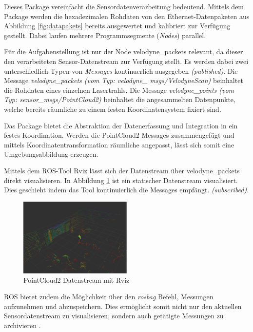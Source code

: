 Dieses Package vereinfacht die Sensordatenverarbeitung bedeutend. Mittels dem Package werden die hexadezimalen Rohdaten von den Ethernet-Datenpaketen aus Abbildung \ref{fig:datapakets} bereits ausgewertet und kalibriert zur Verfügung gestellt. Dabei laufen mehrere Programmsegmente (\textit{Nodes}) parallel. 

Für die Aufgabenstellung ist nur der Node velodyne\_packets relevant, da dieser den verarbeiteten Sensor-Datenstream zur Verfügung stellt. Es werden dabei zwei unterschiedlich Typen von \textit{Messages} kontinuerlich ausgegeben \textit{(published)}. Die Message \textit{velodyne\_packets (vom Typ: velodyne\_ msgs/VelodyneScan)} beinhaltet die Rohdaten eines einzelnen Lasertrahls. Die Message \textit{velodyne\_points (vom Typ: sensor\_msgs/PointCloud2)} beinhaltet die angesammelten Datenpunkte, welche bereits räumliche zu einem festen Koordinatensystem fixiert sind. \cite{ROSvelodyne}

Das Package bietet die Abstraktion der Datenerfassung und Integration in ein festes Koordination. Werden die PointCloud2 Messages zusammengefügt und mittels Koordinatentransformation räumliche angepasst, lässt sich somit eine Umgebungsabbildung erzeugen. 

Mittels dem ROS-Tool Rviz lässt sich der Datenstream über velodyne\_packets direkt visualisieren. In Abbildung \ref{fig:rviz} ist ein statischer Datenstream visualisiert. Dies geschieht indem das Tool kontinuierlich die Messages empfängt. \textit{(subscribed)}. 

\begin{figure}[H]
	\centering
	\includegraphics[width=0.5\textwidth]{resources/rviz.PNG}
	\caption[PointCloud2 Datenstream mit Rviz]{PointCloud2 Datenstream mit Rviz}
	\label{fig:rviz}
\end{figure} 

ROS bietet zudem die Möglichkeit über den \textit{rosbag} Befehl, Messungen aufzunehmen und abzuspeichern. Dies ermöglicht somit nicht nur den aktuellen Sensordatenstream zu visualisieren, sondern auch getätigte Messungen zu archivieren \cite{ROSTutorials}. 

